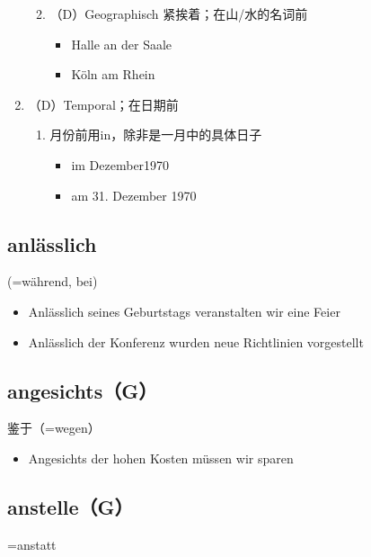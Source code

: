 \documentclass[UTF8]{report}
\begin{document}
\begin{enumerate}
\begin{enumerate}
\begin{itemize}
\begin{figure}[H]
            \end{figure}
        \end{itemize}
        \item （D）Geographisch 紧挨着；在山/水的名词前
        \begin{itemize}
            \item Halle an der Saale
            \item Köln am Rhein
        \end{itemize}
    \end{enumerate}
    \item （D）Temporal；在日期前
    \begin{enumerate}
        \item 月份前用in，除非是一月中的具体日子
        \begin{itemize}
            \item im Dezember1970
            \item am 31. Dezember 1970
        \end{itemize}
    \end{enumerate}
\end{enumerate}

\subsection{anlässlich}
(=während, bei)
\begin{itemize}
    \item Anlässlich seines Geburtstags veranstalten wir eine Feier
    \item Anlässlich der Konferenz wurden neue Richtlinien vorgestellt
\end{itemize}

\subsection{angesichts（G）}
鉴于（=wegen）
\begin{itemize}
    \item Angesichts der hohen Kosten müssen wir sparen
\end{itemize}

\subsection{anstelle（G）}
=anstatt
\end{document}
